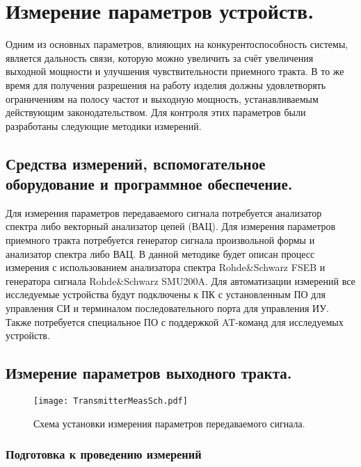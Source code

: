 \section{Измерение параметров устройств.}

Одним из основных параметров, влияющих на конкурентоспособность системы, является дальность связи, которую можно увеличить за счёт увеличения выходной мощности и улучшения чувствительности приемного тракта. В то же время для получения разрешения на работу изделия должны удовлетворять ограничениям на полосу частот и выходную мощность, устанавливаемым действующим законодательством. Для контроля этих параметров были разработаны следующие методики измерений.

\subsection{Средства измерений, вспомогательное оборудование и программное обеспечение.}

Для измерения параметров передаваемого сигнала потребуется анализатор спектра либо векторный анализатор цепей (ВАЦ).
Для измерения параметров приемного тракта потребуется генератор сигнала произвольной формы и анализатор спектра либо ВАЦ. 
В данной методике будет описан процесс измерения с использованием анализатора спектра Rohde\&Schwarz FSEB и генератора сигнала Rohde\&Schwarz SMU200A. 
Для автоматизации измерений все исследуемые устройства будут подключены к ПК с установленным ПО для управления СИ и терминалом последовательного порта для управления ИУ. Также потребуется специальное ПО с поддержкой AT-команд для исследуемых устройств.

\subsection{Измерение параметров выходного тракта.}

\begin{figure}[H]
	\centering
	\texttt{[image: TransmitterMeasSch.pdf]}
	\caption{Схема установки измерения параметров передаваемого сигнала.}
	\label{fig:TransmitterMeasSch}
\end{figure}

\subsubsection{Подготовка к проведению измерений}


